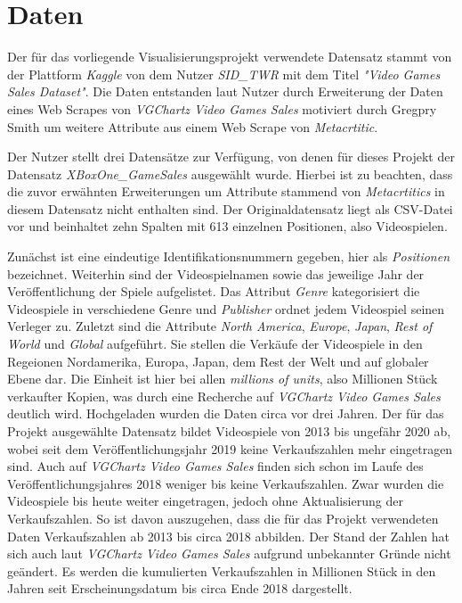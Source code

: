 \documentclass[usegeometry=true]{scrartcl}
\begin{document}
\section{Daten}
Der für das vorliegende Visualisierungsprojekt verwendete Datensatz stammt von der Plattform \textit{Kaggle} von dem Nutzer \textit{SID_TWR} mit dem Titel \textit{"Video Games Sales Dataset"}. 
Die Daten entstanden laut Nutzer durch Erweiterung der Daten eines Web Scrapes von \textit{VGChartz Video Games Sales} motiviert durch Gregpry Smith um weitere Attribute aus einem Web Scrape von \textit{Metacrtitic}.  %

Der Nutzer stellt drei Datensätze zur Verfügung, von denen für dieses Projekt der Datensatz \textit{XBoxOne_GameSales} ausgewählt wurde. 
Hierbei ist zu beachten, dass die zuvor erwähnten Erweiterungen um Attribute stammend von \textit{Metacrtitics} in diesem Datensatz nicht enthalten sind. 
Der Originaldatensatz liegt als CSV-Datei vor und beinhaltet zehn Spalten mit 613 einzelnen Positionen, also Videospielen. 

Zunächst ist eine eindeutige Identifikationsnummern gegeben, hier als \textit{Positionen} bezeichnet. Weiterhin sind der Videospielnamen sowie das jeweilige Jahr der Veröffentlichung der Spiele aufgelistet. 
Das Attribut \textit{Genre} kategorisiert die Videospiele in verschiedene Genre und \textit{Publisher} ordnet jedem Videospiel seinen Verleger zu. 
Zuletzt sind die Attribute \textit{North America}, \textit{Europe}, \textit{Japan}, \textit{Rest of World} und \textit{Global} aufgeführt. 
Sie stellen die Verkäufe der Videospiele in den Regeionen Nordamerika, Europa, Japan, dem Rest der Welt und auf globaler Ebene dar. 
Die Einheit ist hier bei allen \textit{millions of units}, also Millionen Stück verkaufter Kopien, was durch eine Recherche auf \textit{VGChartz Video Games Sales} deutlich wird. %
Hochgeladen wurden die Daten circa vor drei Jahren. Der für das Projekt ausgewählte Datensatz bildet Videospiele von 2013 bis ungefähr 2020 ab, wobei seit dem Veröffentlichungsjahr 2019 keine Verkaufszahlen mehr eingetragen sind. 
Auch auf \textit{VGChartz Video Games Sales} finden sich schon im Laufe des Veröffentlichungsjahres 2018 weniger bis keine Verkaufszahlen. 
Zwar wurden die Videospiele bis heute weiter eingetragen, jedoch ohne Aktualisierung der Verkaufszahlen. 
So ist davon auszugehen, dass die für das Projekt verwendeten Daten Verkaufszahlen ab 2013 bis circa 2018 abbilden. 
Der Stand der Zahlen hat sich auch laut \textit{VGChartz Video Games Sales} aufgrund unbekannter Gründe nicht geändert. 
Es werden die kumulierten Verkaufszahlen in Millionen Stück in den Jahren seit Erscheinungsdatum bis circa Ende 2018 dargestellt. 
\end{document}
